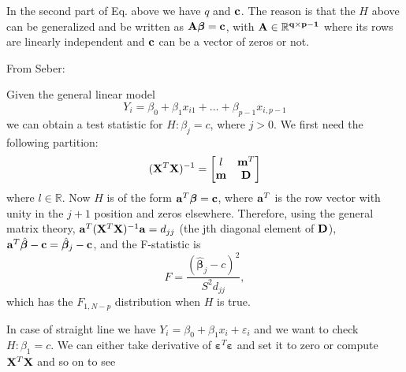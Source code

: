 In the second part of Eq. above we have $q$ and $\bf c$.
The reason is that the $H$ above can be generalized
and be written as $\bf A \boldsymbol \beta = \bf c$,
with $\bf A \in \mathbb{R}^{q \times {p-1}}$ where its
rows are linearly independent and $\bf c$ can be a vector
of zeros or not.\\

\begin{exm}\label{exm:HypTestOneCoeffLinReg}
From Seber:

Given the general linear model
\[Y_i = \beta_0 + \beta_1 x_{i1} + \dots + \beta_{p-1}x_{i,p-1}\]
we can obtain a test statistic for $H:\beta_j=c$, where $j > 0$.
We first need the following partition:
\[ 
({\bf X}^T{\bf X})^{-1} = 
\begin{bmatrix}
l & {\bf m}^T\\
{\bf m} & {\bf D}
\end{bmatrix}
\]
where $l \in \mathbb{R}$.
Now $H$ is of the form ${\bf a}^T{\boldsymbol \beta}={\bf c}$, 
where ${\bf a}^T$ is the row vector with unity in 
the $j+1$ position and zeros elsewhere.
Therefore, using the general matrix theory, 
${\bf a}^T ({\bf X}^T{\bf X})^{-1} {\bf a} =d_{jj}$ 
(the jth diagonal element of $\bf D$), 
${\bf a}^T{\hat {\boldsymbol \beta}} - {\bf c}={\hat {\boldsymbol \beta}}_j - {\bf c}$, 
and the F-statistic is
\[F = \frac{({\hat {\boldsymbol \beta}}_j-c)^2}{S^2d_{jj}},\]
which has the $F_{1, N-p}$ distribution when $H$ is true. 
\end {exm}



In case of straight line we have 
$Y_i = \beta_0 + \beta_1 x_i + \varepsilon_i$ and
we want to check $H:\beta_1 = c$.
We can either take derivative of 
$\boldsymbol{\varepsilon}^T\boldsymbol {\varepsilon}$
and set it to zero or compute ${\bf X}^T{\bf X}$ and so on
to see

